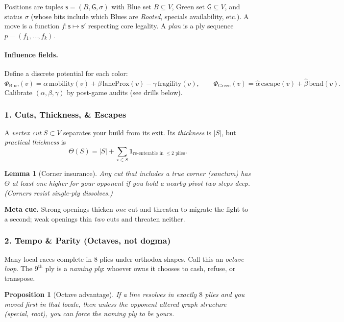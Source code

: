 \documentclass[11pt]{article}
\numberwithin{equation}{section} %
\theoremstyle{plain} %
\newtheorem{lemma}[theorem]{Lemma}
\newtheorem{proposition}[theorem]{Proposition}
\theoremstyle{definition} %
\theoremstyle{remark} %
\begin{document}
Positions are tuples \(\mathsf{s}=(B,\mathsf{G},\sigma)\) with Blue set \(B\subseteq V\), Green set \(\mathsf{G}\subseteq V\), and status \(\sigma\) (whose bits include which Blues are \emph{Rooted}, specials availability, etc.). A move is a function \(f:\mathsf{s}\mapsto \mathsf{s}'\) respecting core legality. A \emph{plan} is a ply sequence \(p=(f_1,\dots,f_k)\).

\paragraph{Influence fields.} Define a discrete potential for each color:
\[
\Phi_{\mathrm{Blue}}(v)= \alpha\,\mathrm{mobility}(v) + \beta\,\mathrm{laneProx}(v) - \gamma\,\mathrm{fragility}(v),
\qquad
\Phi_{\mathrm{Green}}(v)= \hat{\alpha}\,\mathrm{escape}(v) + \hat{\beta}\,\mathrm{bend}(v).
\]
Calibrate \((\alpha,\beta,\gamma)\) by post-game audits (see drills below).

\subsubsection{1. Cuts, Thickness, \& Escapes}
\label{ael-core:cuts}
A \emph{vertex cut} \(S\subset V\) separates your build from its exit. Its \emph{thickness} is \(|S|\), but \emph{practical thickness} is
\[
\Theta(S)= |S| + \sum_{v\in S}\mathbf{1}_{\text{re-enterable in }\leq 2\text{ plies}}.
\]

\begin{lemma}[Corner insurance]
Any cut that includes a true corner (\emph{sanctum}) has \(\Theta\) at least one higher for your opponent if you hold a nearby pivot two steps deep. (Corners resist single-ply dissolves.)
\end{lemma}

\noindent\textbf{Meta cue.} Strong openings thicken \emph{one} cut and threaten to migrate the fight to a second; weak openings thin \emph{two} cuts and threaten neither.

\subsubsection{2. Tempo \& Parity (Octaves, not dogma)}
\label{ael-core:parity}
Many local races complete in \(8\) plies under orthodox shapes. Call this an \emph{octave loop}. The \(9^\text{th}\) ply is a \emph{naming ply}: whoever owns it chooses to cash, refuse, or transpose.

\begin{proposition}[Octave advantage]
If a line resolves in exactly \(8\) plies and you moved first in that locale, then unless the opponent altered graph structure (special, root), you can force the naming ply to be \emph{yours}.
\end{proposition}
\end{document}
